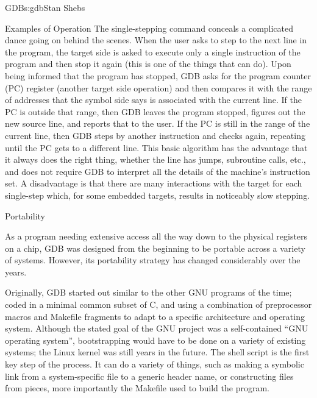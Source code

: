 \begin{aosachapter}{GDB}{s:gdb}{Stan Shebs}
\begin{aosasect1}{Examples of Operation}
\pagebreak %
The single-stepping command  conceals a complicated dance
going on behind the scenes.  When the user asks to step to the next
line in the program, the target side is asked to execute only a single
instruction of the program and then stop it again (this is one of the
things that  can do).  Upon being informed that the
program has stopped, GDB asks for the program counter (PC) register
(another target side operation) and then compares it with the range of
addresses that the symbol side says is associated with the current
line.  If the PC is outside that range, then GDB leaves the program
stopped, figures out the new source line, and reports that to the
user.  If the PC is still in the range of the current line, then GDB
steps by another instruction and checks again, repeating until the PC
gets to a different line.  This basic algorithm has the advantage that
it always does the right thing, whether the line has jumps, subroutine
calls, etc., and does not require GDB to interpret all the details of
the machine's instruction set.  A disadvantage is that there are many
interactions with the target for each single-step which, for some
embedded targets, results in noticeably slow stepping.

\end{aosasect1}

\begin{aosasect1}{Portability}

As a program needing extensive access all the way down to the physical
registers on a chip, GDB was designed from the beginning to be
portable across a variety of systems.  However, its portability
strategy has changed considerably over the years.

Originally, GDB started out similar to the other GNU programs of the
time; coded in a minimal common subset of C, and using a combination
of preprocessor macros and Makefile fragments to adapt to a specific
architecture and operating system.  Although the stated goal of the
GNU project was a self-contained ``GNU operating system'',
bootstrapping would have to be done on a variety of existing systems;
the Linux kernel was still years in the future.  The 
shell script is the first key step of the process.  It can do a
variety of things, such as making a symbolic link from a
system-specific file to a generic header name, or constructing files
from pieces, more importantly the Makefile used to build the program.


\end{aosasect1}
\end{aosachapter}

